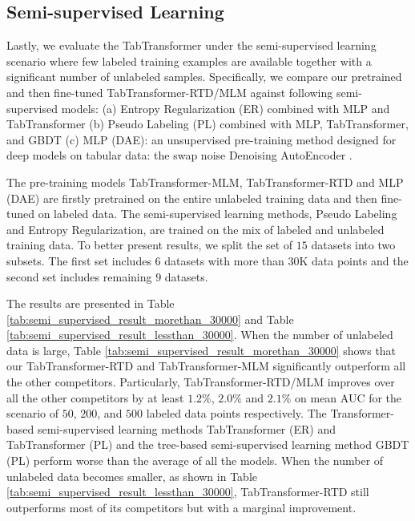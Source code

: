 \subsection{Semi-supervised Learning}\label{subsec: semi-supervised-learning}
Lastly, we evaluate the TabTransformer under the semi-supervised learning scenario where few labeled training examples are available together with a significant number of unlabeled samples. Specifically, we compare our pretrained and then fine-tuned TabTransformer-RTD/MLM against following semi-supervised models: (a) Entropy Regularization (ER) \citep{grandvalet2006entropy} combined with MLP and TabTransformer (b) Pseudo Labeling (PL) \citep{lee2013pseudo} combined with MLP, TabTransformer, and GBDT \citep{JainGBDTPseudolabel} (c)  MLP (DAE): an unsupervised pre-training method designed for deep models on tabular data: the swap noise Denoising AutoEncoder \citep{jahrer_2018}. 

The pre-training models TabTransformer-MLM, TabTransformer-RTD and MLP (DAE)
are firstly pretrained on the entire unlabeled training data and then fine-tuned on labeled data. The semi-supervised learning methods, Pseudo Labeling and Entropy Regularization, are trained on the mix of labeled and unlabeled training data.
To better present results, we split the set of $15$ datasets into two subsets. The first set includes $6$ datasets with more than $30$K data points and the second set includes remaining $9$ datasets. 

The results are presented in Table \ref{tab:semi_supervised_result_morethan_30000} and Table \ref{tab:semi_supervised_result_lessthan_30000}. When the number of unlabeled data is large, Table \ref{tab:semi_supervised_result_morethan_30000} shows that our TabTransformer-RTD and TabTransformer-MLM significantly outperform all the other competitors. Particularly, TabTransformer-RTD/MLM improves over all the other competitors by at least $1.2\%$, $2.0\%$ and $2.1\%$ on mean AUC for the scenario of $50$, $200$, and $500$ labeled data points respectively. The Transformer-based semi-supervised learning methods TabTransformer (ER) and TabTransformer (PL) and the tree-based semi-supervised learning method GBDT (PL) perform worse than the average of all the models. When the number of unlabeled data becomes smaller, as shown in Table \ref{tab:semi_supervised_result_lessthan_30000}, TabTransformer-RTD still outperforms most of its competitors but with a marginal improvement.

